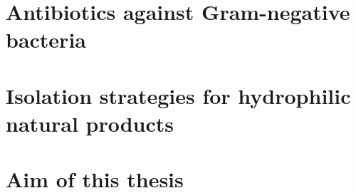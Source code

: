 
\section{Antibiotics against Gram-negative bacteria} %
\label{sec:antibiotics_against_gram_negative_bacteria}


\section{Isolation strategies for hydrophilic natural products} %
\label{sec:isolation_strategies_for_hydrophilic_natural_products}


\section{Aim of this thesis} %
\label{sec:aim_of_this_thesis}

